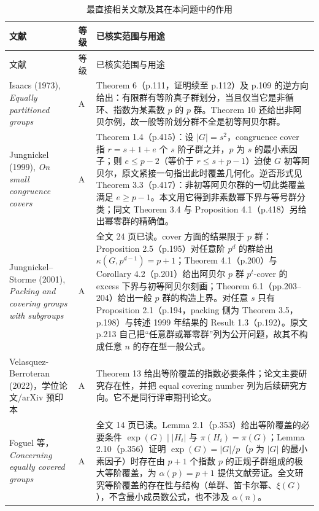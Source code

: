 \documentclass[11pt,a4paper]{article}
\numberwithin{equation}{section}
\theoremstyle{plain}
\theoremstyle{definition}
\theoremstyle{remark}
\begin{document}
\begin{longtable}{L{0.25\textwidth}L{0.10\textwidth}L{0.55\textwidth}}
\caption{最直接相关文献及其在本问题中的作用}\label{tab:literature}\\
\toprule
文献 & 等级 & 已核实范围与用途\\
\midrule
\endfirsthead
\toprule
文献 & 等级 & 已核实范围与用途\\
\midrule
\endhead
Isaacs (1973), \emph{Equally partitioned groups} \cite{Isaacs1973} & A &
Theorem 6（p.111，证明续至 p.112）及 p.109 的逆方向给出：有限群有等阶真子群划分，当且仅当它是非循环、指数为某素数 $p$ 的 $p$ 群。Theorem 10 还给出非阿贝尔例，故一般等阶划分群不全是初等阿贝尔群。\\
Jungnickel (1999), \emph{On small congruence covers} \cite{Jungnickel1999} & A &
Theorem 1.4（p.415）：设 $|G|=s^2$，congruence cover 指 $r=s+1+e$ 个 $s$ 阶子群之并，$p$ 为 $s$ 的最小素因子；则 $e\le p-2$（等价于 $r\le s+p-1$）迫使 $G$ 初等阿贝尔，原文紧接一句指出此时覆盖几何化。逆否形式见 Theorem 3.3（p.417）：非初等阿贝尔群的一切此类覆盖满足 $e\ge p-1$。本文用它得到非素数幂下界与等号群分类；同文 Theorem 3.4 与 Proposition 4.1（p.418）另给出幂零群的精确值。\\
Jungnickel--Storme (2001), \emph{Packing and covering groups with subgroups} \cite{JungnickelStorme2001} & A &
全文 24 页已读。cover 方面的结果限于 $p$ 群：Proposition 2.5（p.195）对任意阶 $p^d$ 的群给出 $\kappa(G,p^{d-1})=p+1$；Theorem 4.1（p.200）与 Corollary 4.2（p.201）给出阿贝尔 $p$ 群 $p^t$-cover 的 excess 下界与初等阿贝尔刻画；Theorem 6.1（pp.203--204）给出一般 $p$ 群的构造上界。对任意 $s$ 只有 Proposition 2.1（p.194，packing 侧为 Theorem 3.5，p.198）与转述 1999 年结果的 Result 1.3（p.192）。原文 p.213 自己把“任意群或幂零群”列为公开问题，故其不构成任意 $n$ 的存在型一般公式。\\
Velasquez-Berroteran (2022)，学位论文/arXiv 预印本 \cite{Velasquez2022} & A &
Theorem 13 给出等阶覆盖的指数必要条件；论文主要研究存在性，并把 equal covering number 列为后续研究方向。它不是同行评审期刊论文。\\
Foguel 等，\emph{Concerning equally covered groups} \cite{Foguel2025} & A &
全文 14 页已读。Lemma 2.1（p.353）给出等阶覆盖的必要条件 $\exp(G)\mid|H_i|$ 与 $\pi(H_i)=\pi(G)$；Lemma 2.10（p.356）证明 $\exp(G)=|G|/p$（$p$ 为 $|G|$ 的最小素因子）时存在由 $p+1$ 个指数 $p$ 的正规子群组成的极大等阶覆盖，为 $\alpha(p)=p+1$ 提供文献旁证。全文研究等阶覆盖的存在性与结构（单群、笛卡尔幂、$\xi(G)$），不含最小成员数公式，也不涉及 $\alpha(n)$。\\
\bottomrule
\end{longtable}
\end{document}
